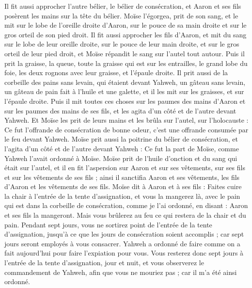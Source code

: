 \begin{multicols}{2}
Il fit aussi approcher l'autre bélier, le bélier de consécration, et Aaron et ses fils posèrent les mains sur la tête du bélier.
Moïse l’égorgea, prit de son sang, et le mit sur le lobe de l'oreille droite d'Aaron, sur le pouce de sa main droite et sur le gros orteil de son pied droit.
Il fit aussi approcher les fils d'Aaron, et mit du sang sur le lobe de leur oreille droite, sur le pouce de leur main droite, et sur le gros orteil de leur pied droit, et Moïse répandit le sang sur l'autel tout autour.
Puis il prit la graisse, la queue, toute la graisse qui est sur les entrailles, le grand lobe du foie, les deux rognons avec leur graisse, et l'épaule droite.
Il prit aussi de la corbeille des pains sans levain, qui étaient devant Yahweh, un gâteau sans levain, un gâteau de pain fait à l'huile et une galette, et il les mit sur les graisses, et sur l'épaule droite.
Puis il mit toutes ces choses sur les paumes des mains d'Aaron et sur les paumes des mains de ses fils, et les agita d’un côté et de l’autre devant Yahweh.
Et Moïse les prit de leurs mains et les brûla sur l'autel, sur l'holocauste : Ce fut l’offrande de consécration de bonne odeur, c'est une offrande consumée par le feu devant Yahweh.
Moïse prit aussi la poitrine du bélier de consécration, et l’agita d’un côté et de l’autre devant Yahweh : Ce fut la part de Moïse, comme Yahweh l'avait ordonné à Moïse.
Moïse prit de l'huile d’onction et du sang qui était sur l'autel, et il en fit l’aspersion sur Aaron et sur ses vêtements, sur ses fils et sur les vêtements de ses fils ; ainsi il sanctifia Aaron et ses vêtements, les fils d’Aaron et les vêtements de ses fils.
Moïse dit à Aaron et à ses fils : Faites cuire la chair à l'entrée de la tente d'assignation, et vous la mangerez là, avec le pain qui est dans la corbeille de consécration, comme je l’ai ordonné, en disant : Aaron et ses fils la mangeront.
Mais vous brûlerez au feu ce qui restera de la chair et du pain.
Pendant sept jours, vous ne sortirez point de l'entrée de la tente d'assignation, jusqu’à ce que les jours de consécration soient accomplis ; car sept jours seront employés à vous consacrer.
Yahweh a ordonné de faire comme on a fait aujourd’hui pour faire l’expiation pour vous.
Vous resterez donc sept jours à l'entrée de la tente d'assignation, jour et nuit, et vous observerez le commandement de Yahweh, afin que vous ne mouriez pas ; car il m'a été ainsi ordonné.

\end{multicols}
